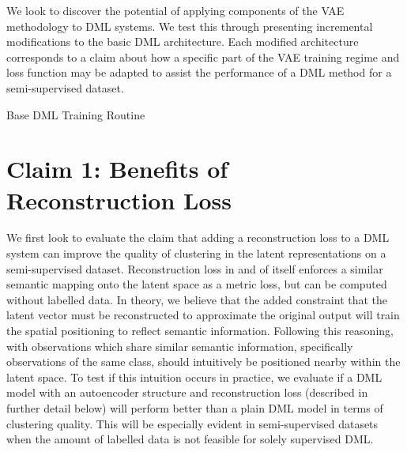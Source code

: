 \documentclass[./dissertation.tex]{subfiles}
\begin{document}
    We look to discover the potential of applying components of the VAE methodology to DML systems. We test this through presenting incremental modifications to the basic DML architecture. Each modified architecture corresponds to a claim about how a specific part of the VAE training regime and loss function may be adapted to assist the performance of a DML method for a semi-supervised dataset.
    

    \begin{algorithm}
    \caption{Base DML Training Routine}\label{alg:two}
    \end{algorithm}
     
    \section{Claim 1: Benefits of Reconstruction Loss}
    We first look to evaluate the claim that adding a reconstruction loss to a DML system can improve the quality of clustering in the latent representations on a semi-supervised dataset. Reconstruction loss in and of itself enforces a similar semantic mapping onto the latent space as a metric loss, but can be computed  without labelled data. In theory, we believe that the added constraint that the latent vector must be reconstructed to approximate the original output will train the spatial positioning to reflect semantic information. Following this reasoning, with observations which share similar semantic information, specifically observations of the same class, should intuitively be positioned nearby within the latent space. To test if this intuition occurs in practice, we evaluate if a DML model with an autoencoder structure and reconstruction loss (described in further detail below) will perform better than a plain DML model in terms of clustering quality. This will be especially evident in semi-supervised datasets when the amount of labelled data is not feasible for solely supervised DML. \\
    
\end{document}
